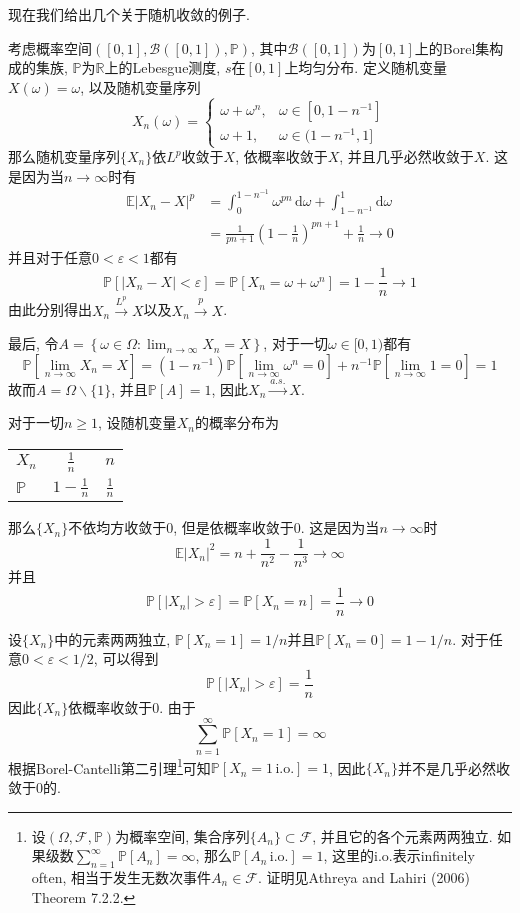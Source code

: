 \documentclass[cn, 12pt, math=mtpro2, bibstyle=apa, blue, twocol]{elegantbook}
\newcommand{\F}{\mathscr{F}}
\newcommand{\R}{\mathbb{R}}
\newcommand{\E}{\mathbb{E}}
\newcommand{\PP}{\mathbb{P}}
\begin{document}
现在我们给出几个关于随机收敛的例子.
\begin{example}\label{eg2}
考虑概率空间$([0,1],\mathscr{B}([0,1]),\PP)$, 其中$\mathscr{B}([0,1])$为$[0,1]$上的Borel集构成的集族, $\PP$为$\R$上的Lebesgue测度, $s$在$[0,1]$上均匀分布. 定义随机变量$X(\omega)=\omega$, 以及随机变量序列
$$X_n(\omega)=\begin{cases}
                \omega+\omega^n, & \omega\in[0,1-n^{-1}] \\
                \omega+1, & \omega\in(1-n^{-1},1]
              \end{cases}$$
那么随机变量序列$\{X_n\}$依$L^p$收敛于$X$, 依概率收敛于$X$, 并且几乎必然收敛于$X$. 这是因为当$n\to\infty$时有
\begin{align*}
\E|X_n-X|^p&=\int_{0}^{1-n^{-1}}\omega^{pn}\,\text{d}\omega+\int_{1-n^{-1}}^{1}\text{d}\omega \\
&=\frac{1}{pn+1}\left(1-\frac{1}{n}\right)^{pn+1}+\frac{1}{n}\to0
\end{align*}
并且对于任意$0<\varepsilon<1$都有
$$\PP[|X_n-X|<\varepsilon]=\PP[X_n=\omega+\omega^n]=1-\frac{1}{n}\to1$$
由此分别得出$X_n\xrightarrow{L^p}X$以及$X_n\xrightarrow{p}X$.

最后, 令$\displaystyle A=\left\{\omega\in\Omega: \lim_{n\to\infty}X_n=X\right\}$, 对于一切$\omega\in[0,1)$都有
$$\PP\left[\lim_{n\to\infty}X_n=X\right]=(1-n^{-1})\PP\left[\lim_{n\to\infty}\omega^n=0\right]+n^{-1}\PP\left[\lim_{n\to\infty}1=0\right]=1$$
故而$A=\Omega\backslash\{1\}$, 并且$\PP[A]=1$, 因此$X_n\xrightarrow{a.s.}X$.
\end{example}

\begin{example}
对于一切$n\ge1$, 设随机变量$X_n$的概率分布为

\begin{table}[!htbp]
\centering
\begin{tabular}{lcc}
$X_n$     & $\displaystyle \frac{1}{n}$   & $n$                           \\
$\PP$ & $\displaystyle 1-\frac{1}{n}$ & $\displaystyle \frac{1}{n}$
\end{tabular}
\end{table}

\noindent 那么$\{X_n\}$不依均方收敛于0, 但是依概率收敛于0. 这是因为当$n\to\infty$时
$$\E|X_n|^2=n+\frac{1}{n^2}-\frac{1}{n^3}\to\infty$$
并且
$$\PP[|X_n|>\varepsilon]=\PP[X_n=n]=\frac{1}{n}\to0$$
\end{example}

\begin{example}
设$\{X_n\}$中的元素两两独立, $\PP[X_n=1]=1/n$并且$\PP[X_n=0]=1-1/n$. 对于任意$0<\varepsilon<1/2$, 可以得到
$$\PP[|X_n|>\varepsilon]=\frac{1}{n}$$
因此$\{X_n\}$依概率收敛于0. 由于
$$\sum_{n=1}^{\infty}\PP[X_n=1]=\infty$$
根据Borel-Cantelli第二引理\footnote{设$(\Omega,\F,\PP)$为概率空间, 集合序列$\{A_n\}\subset\F$, 并且它的各个元素两两独立. 如果级数$\sum_{n=1}^{\infty}\PP[A_n]=\infty$, 那么$\PP[A_n\,\text{i.o.}]=1$, 这里的$\text{i.o.}$表示infinitely often, 相当于发生无数次事件$A_n\in\F$. 证明见Athreya and Lahiri (2006) Theorem 7.2.2.}可知$\PP[X_n=1\,\text{i.o.}]=1$, 因此$\{X_n\}$并不是几乎必然收敛于0的.
\end{example}
\end{document}

